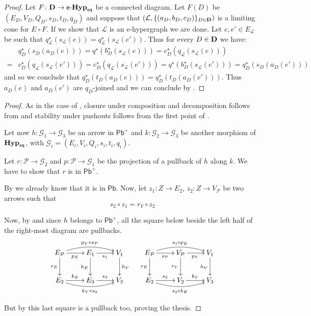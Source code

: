 \documentclass[3p]{elsarticle}
\newcommand{\pbc}{\mathsf{Pb}}
\newcommand{\pbp}{\mathsf{Pb}^{+}}
\newcommand{\eq}{\mathsf{eq}}
\def\D{\textbf {\textup{D}}}
\def\E{\textbf {\textup{E}}}
\newcommand{\catname}[1]{\textbf{\textup{#1}}}
\newcommand{\EqHyp}{\catname{Hyp}_{\mathsf{eq}}} %
\newcommand{\egg}{\mathsf{e}\text{-}\catname{Hyp}_\eq}
\theoremstyle{remark}
\theoremstyle{definition}
\begin{document}
\ecim*
\begin{proof}\label{proof:ecim} Let $F\colon \D\to \egg$ be a connected diagram. Let $F(D)$ be $(E_D, V_D, Q_D, s_D, t_D, q_D)$ and suppose that $(\mathcal{L}, \{(a_D, b_D, c_D)\}_{D\in \D})$ is a limiting cone for $E\circ F$. If we show that $\mathcal{L}$ is an e-hypergraph we are done. Let $e, e'\in E_{\mathcal{L}}$ be such that $q^\star_{\mathcal{L}}(s_{\mathcal{L}}(e))=q^\star_{\mathcal{L}}(s_{\mathcal{L}}(e'))$. Thus for every $D\in \D$ we have:
	\begin{align*}
		&q^\star_D(s_D(a_D(e)))=q^\star(b^\star_D(s_{\mathcal{L}}(e)))=c^\star_D(q_{\mathcal{L}}(s_{\mathcal{L}}(e)))\\=&c^\star_D(q_{\mathcal{L}}(s_{\mathcal{L}}(e')))=c^\star_D(q_{\mathcal{L}}(s_{\mathcal{L}}(e')))=q^\star(b^\star_D(s_{\mathcal{L}}(e')))=q^\star_D(s_D(a_D(e')))
	\end{align*}
	and so we conclude that $q^\star_D(t_D(a_D(e)))=q^\star_D(t_D(a_D(e')))$. Thus $a_D(e)$ and $a_D(e')$ are $q_D$-joined and we can conclude by .
\end{proof}

\pbsuit*

\begin{proof}\label{proof:pbmonoplus}
	As in the case of , closure under composition and decomposition follows from  and stability under pushouts follows from the first point of . 
	
	Let now $h\colon \mathcal{G}_1\to \mathcal{G}_3$ be an arrow in $\pbp$ and $k\colon \mathcal{G}_2\to \mathcal{G}_3$ be another morphism of $\EqHyp$, with $\mathcal{G}_{i}=(E_i, V_i, Q_i, s_i, t_i, q_i)$.
	
	Let $r\colon \mathcal{P} \to \mathcal{G}_2$ and $p\colon \mathcal{P}\to \mathcal{G}_1$ be the projection of a pullback of $h$ along $k$. We have to show that $r$ is in $\pbp$. 
	
	By  we already know that it is in $\pbc$. Now, let $z_1\colon Z\to E_{2}$, $z_2\colon Z\to V_\mathcal{P}$ be two arrows such that 
	\[s_2\circ z_1=r_V\circ z_2\]
	
	Now, by  and since $h$ belongs to $\pbp$, all the square below beside the left half of the right-most diagram are pullbacks.
	\[\xymatrix{E_{\mathcal{P}} \ar@/^.3cm/[rr]^{p_V\circ s_{\mathcal{P}}} \ar[d]_{r_E}\ar[r]_{p_E}& E_1 \ar[d]_{h_E} \ar[r]_{s_1} & V_1\ar[d]^{h_V} & E_{\mathcal{P}} \ar@/^.3cm/[rr]^{s_1\circ p_E}\ar[d]_{r_E} \ar[r]_{s_{\mathcal{P}}}& V_{\mathcal{P}} \ar[d]_{r_V} \ar[r]_{p_V} & V_1 \ar[d]_{h_V}\\E_2\ar@/_.3cm/[rr]_{k_V\circ s_{2}}\ar[r]^{k_E} & E_3 \ar[r]^{s_3} & V_3 & E_{2} \ar[r]^{s_2} \ar@/_.3cm/[rr]_{s_3\circ k_E}& V_2 \ar[r]^{k_V} & V_3}\]
	
	But by  this last square is a pullback too, proving the thesis. 
\end{proof}
\end{document}
